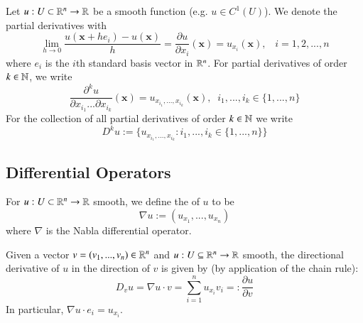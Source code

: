 \documentclass[12pt, a4paper, oneside, openright, titlepage]{book}
\begin{document}
\begin{nota}
    Let $u:U\subset \mathbb R^n\rightarrow \mathbb R$ be a smooth function (e.g. $u \in C^1(U)$). We denote the partial derivatives with \begin{equation*}
        \lim\limits_{h\rightarrow 0}\frac{u(\mathbf{x}+he_i)-u(\mathbf{x})}{h} = \frac{\partial u}{\partial x_i}(\mathbf{x}) = u_{x_i}(\mathbf{x}), \;\;\;i = 1,2,...,n
    \end{equation*}
    where $e_i$ is the $i$th standard basis vector in $\mathbb R^n$. For partial derivatives of order $k \in \mathbb N$, we write \begin{equation*}
        \frac{\partial^ku}{\partial x_{i_1}...\partial x_{i_k}}(\mathbf{x}) = u_{x_{i_1},...,x_{i_k}}(\mathbf{x}),\;\;i_1,...,i_k \in \{1,...,n\}
    \end{equation*}
    For the collection of all partial derivatives of order $k \in \mathbb N$ we write \begin{equation*}
        D^ku := \{u_{x_{i_1},...,x_{i_k}}:i_1,...,i_k \in \{1,...,n\}\} 
    \end{equation*}
\end{nota}

\subsection{Differential Operators}

\begin{defn}
    For $u:U\subset \mathbb R^n\rightarrow \mathbb R$ smooth, we define the  of $u$ to be \begin{equation*}
        \nabla u := (u_{x_1},...,u_{x_n})
    \end{equation*}
    where $\nabla$ is the Nabla differential operator.
\end{defn}

\begin{defn}
    Given a vector $v = (v_1,...,v_n) \in \mathbb R^n$ and $u:U\subseteq \mathbb R^n\rightarrow \mathbb R$ smooth, the directional derivative of $u$ in the direction of $v$ is given by (by application of the chain rule):\begin{equation*}
        D_vu = \nabla u\cdot v = \sum_{i=1}^nu_{x_i}v_i =: \frac{\partial u}{\partial v}
    \end{equation*}
    In particular, $\nabla u\cdot e_i = u_{x_i}$.
\end{defn}
\end{document}
